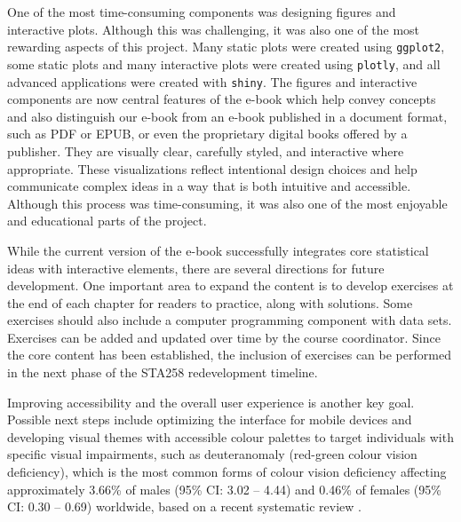 \documentclass[11pt]{article}
\begin{document}
One of the most time-consuming components was designing figures and interactive plots. 
Although this was challenging, it was also one of the most rewarding aspects of this project.
Many static plots were created using \texttt{ggplot2}, some static plots and many interactive plots were created using \texttt{plotly}, 
and all advanced applications were created with \texttt{shiny}. 
The figures and interactive components are now central features of the e-book which help convey concepts and also distinguish our e-book from an e-book published in a document format, such as PDF or EPUB, or even the proprietary digital books offered by a publisher.
They are visually clear, carefully styled, and interactive where appropriate. These visualizations reflect intentional design choices and help communicate complex ideas in a way that is both intuitive and accessible. Although this process was time-consuming, it was also one of the most enjoyable and educational parts of the project.


While the current version of the e-book successfully integrates core statistical ideas with interactive elements, there are several directions for future development. 
One important area to expand the content is to develop exercises at the end of each chapter for readers to practice, along with solutions.
Some exercises should also include a computer programming component with data sets.
Exercises can be added and updated over time by the course coordinator.
Since the core content has been established, the inclusion of exercises can be performed in the next phase of the STA258 redevelopment timeline.


Improving accessibility and the overall user experience is another key goal. 
Possible next steps include optimizing the interface for mobile devices and developing visual themes with accessible colour palettes to target individuals with specific visual impairments, such as deuteranomaly (red-green colour vision deficiency), which is the most common forms of colour vision deficiency affecting approximately 3.66\% of males (95\% CI: 3.02 -- 4.44) and 0.46\% of females (95\% CI: 0.30 -- 0.69) worldwide, based on a recent systematic review \cite{Jeong2025}.
\end{document}
